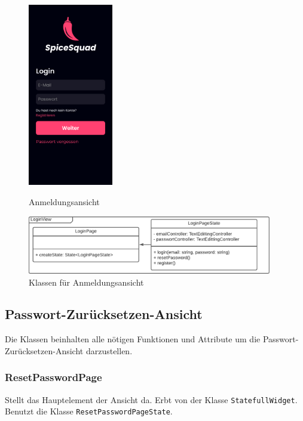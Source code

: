 \documentclass{entwurfsheft}
\begin{document}
    \begin{figure}[htp]
        \begin{minipage}
            [t]{0.49\textwidth}
            \centering
            \includegraphics[height=80mm]{images/Presentation-layer/LoginView.jpg}
            \caption{Anmeldungsansicht}
        \end{minipage}
        \begin{minipage}
            [t]{0.49\textwidth}
            \centering
            \includegraphics[width=0.95\textwidth]{images/Presentation-layer/LoginViewClass.pdf}
            \caption{Klassen für Anmeldungsansicht}
        \end{minipage}
    \end{figure} 
        
    \newpage

\subsection{Passwort-Zurücksetzen-Ansicht}
    Die Klassen beinhalten alle nötigen Funktionen und Attribute um die Passwort-Zurücksetzen-Ansicht darzustellen.
    
    \subsubsection{ResetPasswordPage}
        Stellt das Hauptelement der Ansicht da. Erbt von der Klasse \texttt{StatefullWidget}. Benutzt die Klasse \texttt{ResetPasswordPageState}. 
\end{document}
